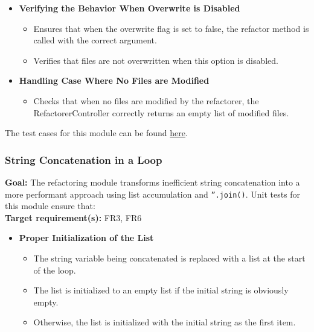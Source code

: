 \documentclass[12pt, titlepage]{article}
\begin{document}
\begin{enumerate}[label={\bf \textcolor{Maroon}{test-SRT-\arabic*}}, wide=0pt, font=\itshape]
\begin{itemize}
    \item \textbf{Verifying the Behavior When Overwrite is Disabled}
    \begin{itemize}
        \item Ensures that when the overwrite flag is set to false, the refactor method is called with the correct argument.
        \item Verifies that files are not overwritten when this option is disabled.
    \end{itemize}

    \item \textbf{Handling Case Where No Files are Modified}
    \begin{itemize}
        \item Checks that when no files are modified by the refactorer, the RefactorerController correctly returns an empty list of modified files.
    \end{itemize}
\end{itemize}

\noindent The test cases for this module can be found \href{https://github.com/ssm-lab/capstone--source-code-optimizer/blob/new-poc/tests/controllers/test_refactorer_controller.py}{here}.

\subsubsection{String Concatenation in a Loop}

\textbf{Goal:} The refactoring module transforms inefficient string concatenation into a more performant approach using list accumulation and \texttt{''.join()}. Unit tests for this module ensure that:\\

\noindent\textbf{Target requirement(s):} FR3, FR6~\cite{SRS} \\

\begin{itemize}
    \item \textbf{Proper Initialization of the List}
    \begin{itemize}
        \item The string variable being concatenated is replaced with a list at the start of the loop.
        \item The list is initialized to an empty list if the initial string is obviously empty.
        \item Otherwise, the list is initialized with the initial string as the first item.
    \end{itemize}


\end{itemize}
\end{enumerate}
\end{document}
